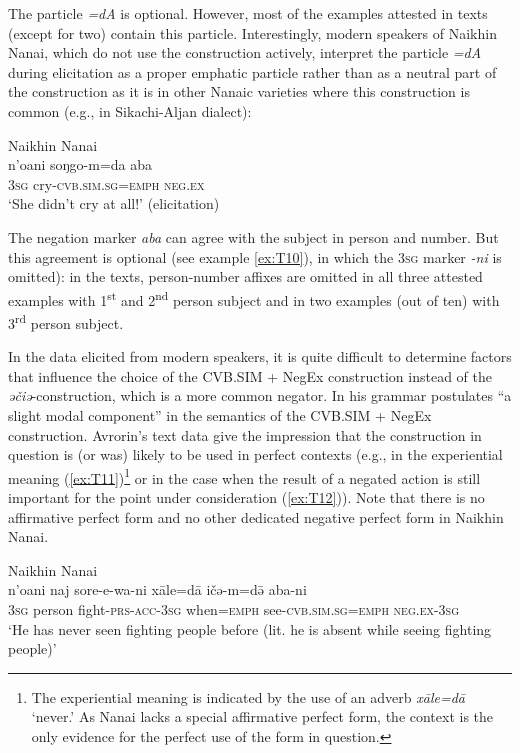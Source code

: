 \documentclass[output=paper]{langscibook}
\begin{document}
The particle \textit{=dA} is optional. However, most of the examples attested in texts (except for two) contain this particle. Interestingly, modern speakers of Naikhin Nanai, which do not use the construction actively, interpret the particle \textit{=dA} during elicitation as a proper emphatic particle rather than as a neutral part of the construction as it is in other Nanaic varieties where this construction is common (e.g., in Sikachi-Aljan dialect):

\ea Naikhin Nanai \label{ex:T10}\\
	\gll n’oani	soŋgo-m=da	aba\\
	\textsc{3sg}	cry-\textsc{cvb.sim.sg=emph}	\textsc{neg.ex}\\
	\glt `She didn’t cry at all!' (elicitation)
\z

The negation marker \textit{aba} can agree with the subject in person and number. But this agreement is optional (see example \ref{ex:T10}), in which the \textsc{3sg} marker \textit{-ni} is omitted): in the texts, person-number affixes are omitted in all three attested examples with 1\textsuperscript{st} and 2\textsuperscript{nd} person subject and in two examples (out of ten) with 3\textsuperscript{rd} person subject.

In the data elicited from modern speakers, it is quite difficult to determine factors that influence the choice of the CVB.SIM + NegEx construction instead of the \textit{əčiə}-construction, which is a more common negator. In his grammar \citet[108]{avrorin1961a} postulates “a slight modal component” in the semantics of the CVB.SIM + NegEx construction. Avrorin’s text data give the impression that the construction in question is (or was) likely to be used in perfect contexts (e.g., in the experiential meaning (\ref{ex:T11})\footnote{The experiential meaning is indicated by the use of an adverb \textit{xāle=dā} ‘never.’ As Nanai lacks a special affirmative perfect form, the context is the only evidence for the perfect use of the form in question.} or in the case when the result of a negated action is still important for the point under consideration (\ref{ex:T12})). Note that there is no affirmative perfect form and no other dedicated negative perfect form in Naikhin Nanai.

\ea Naikhin Nanai \label{ex:T11}\\
	\gll n’oani	naj	sore-e-wa-ni	xāle=dā	ičə-m=də̄	aba-ni\\
	\textsc{3sg}	person	fight-\textsc{prs-acc-3sg}	when=\textsc{emph}	see-\textsc{cvb.sim.sg=emph}	\textsc{neg.ex-3sg}\\
	\glt `He has never seen fighting people before (lit. he is absent while seeing fighting people)' \citep[154, text]{avrorin1986a}
\z
\end{document}
